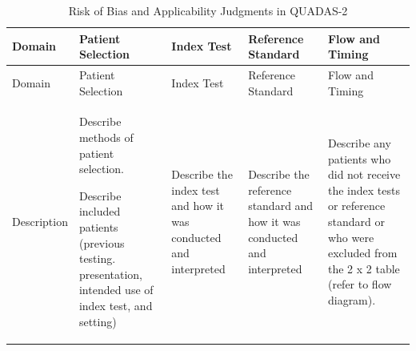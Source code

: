\documentclass[
  11pt,
  a4paper,
  DIV=11,
  numbers=noendperiod]{scrreprt}
\begin{document}
\begin{longtable}[]{@{}
  >{\raggedright\arraybackslash}p{}
  >{\raggedright\arraybackslash}p{}
  >{\raggedright\arraybackslash}p{}
  >{\raggedright\arraybackslash}p{}
  >{\raggedright\arraybackslash}p{}@{}}
\caption{Risk of Bias and Applicability Judgments in
QUADAS-2}\label{tbl-quad}\tabularnewline
\toprule\noalign{}
\begin{minipage}[b]{\linewidth}\raggedright
Domain
\end{minipage} & \begin{minipage}[b]{\linewidth}\raggedright
Patient Selection
\end{minipage} & \begin{minipage}[b]{\linewidth}\raggedright
Index Test
\end{minipage} & \begin{minipage}[b]{\linewidth}\raggedright
Reference Standard
\end{minipage} & \begin{minipage}[b]{\linewidth}\raggedright
Flow and Timing
\end{minipage} \\
\midrule\noalign{}
\endfirsthead
\toprule\noalign{}
\begin{minipage}[b]{\linewidth}\raggedright
Domain
\end{minipage} & \begin{minipage}[b]{\linewidth}\raggedright
Patient Selection
\end{minipage} & \begin{minipage}[b]{\linewidth}\raggedright
Index Test
\end{minipage} & \begin{minipage}[b]{\linewidth}\raggedright
Reference Standard
\end{minipage} & \begin{minipage}[b]{\linewidth}\raggedright
Flow and Timing
\end{minipage} \\
\midrule\noalign{}
\endhead
\bottomrule\noalign{}
\endlastfoot
Description & Describe methods of patient selection.

Describe included patients (previous testing. presentation, intended use
of index test, and setting) & Describe the index test and how it was
conducted and interpreted & Describe the reference standard and how it
was conducted and interpreted & Describe any patients who did not
receive the index tests or reference standard or who were excluded from
the 2 x 2 table (refer to flow diagram).


\end{longtable}
\end{document}
